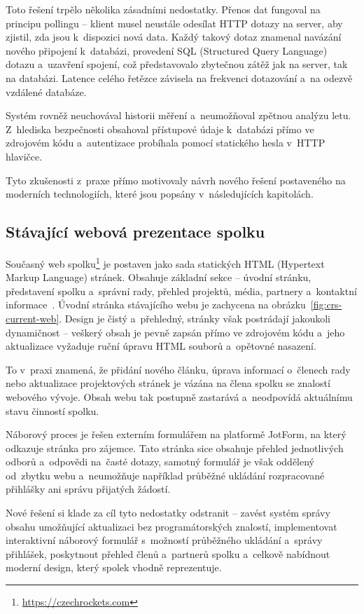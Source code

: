 Toto řešení trpělo několika zásadními nedostatky. Přenos dat fungoval na principu pollingu -- klient musel neustále odesílat HTTP dotazy na server, aby zjistil, zda jsou k~dispozici nová data. Každý takový dotaz znamenal navázání nového připojení k~databázi, provedení SQL (Structured Query Language) dotazu a~uzavření spojení, což představovalo zbytečnou zátěž jak na server, tak na databázi. Latence celého řetězce závisela na frekvenci dotazování a~na odezvě vzdálené databáze.

Systém rovněž neuchovával historii měření a~neumožňoval zpětnou analýzu letu. Z~hlediska bezpečnosti obsahoval přístupové údaje k~databázi přímo ve zdrojovém kódu a~autentizace probíhala pomocí statického hesla v~HTTP hlavičce.

Tyto zkušenosti z~praxe přímo motivovaly návrh nového řešení postaveného na moderních technologiích, které jsou popsány v~následujících kapitolách.

\subsection{Stávající webová prezentace spolku}
Současný web spolku\footnote{\url{https://czechrockets.com}} je postaven jako sada statických HTML (Hypertext Markup Language) stránek. Obsahuje základní sekce -- úvodní stránku, představení spolku a~správní rady, přehled projektů, média, partnery a~kontaktní informace~\cite{crs2024web}. Úvodní stránka stávajícího webu je zachycena na obrázku~\ref{fig:crs-current-web}. Design je čistý a~přehledný, stránky však postrádají jakoukoli dynamičnost -- veškerý obsah je pevně zapsán přímo ve zdrojovém kódu a~jeho aktualizace vyžaduje ruční úpravu HTML souborů a~opětovné nasazení.

To v~praxi znamená, že přidání nového článku, úprava informací o~členech rady nebo aktualizace projektových stránek je vázána na člena spolku se znalostí webového vývoje. Obsah webu tak postupně zastarává a~neodpovídá aktuálnímu stavu činností spolku.

Náborový proces je řešen externím formulářem na platformě JotForm, na který odkazuje stránka pro zájemce. Tato stránka sice obsahuje přehled jednotlivých odborů a~odpovědi na~časté dotazy, samotný formulář je však oddělený od~zbytku webu a~neumožňuje například průběžné ukládání rozpracované přihlášky ani správu přijatých žádostí.

Nové řešení si klade za cíl tyto nedostatky odstranit -- zavést systém správy obsahu umožňující aktualizaci bez programátorských znalostí, implementovat interaktivní náborový formulář s~možností průběžného ukládání a~správy přihlášek, poskytnout přehled členů a~partnerů spolku a~celkově nabídnout moderní design, který spolek vhodně reprezentuje.

